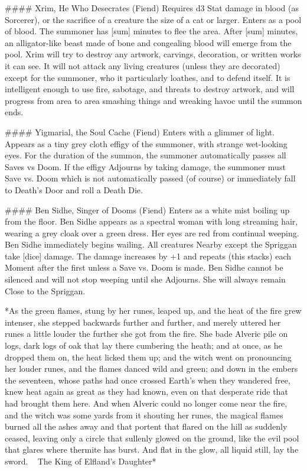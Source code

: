 ####  Xrim, He Who Desecrates (Fiend)
Requires d3 Stat damage in blood (as Sorcerer), or the sacrifice of a creature the size of a cat or larger.  Enters as a pool of blood. The summoner has [sum] minutes to flee the area. After [sum] minutes, an alligator-like beast made of bone and congealing blood will emerge from the pool. Xrim will try to destroy any artwork, carvings, decoration, or written works it can see. It will not attack any living creatures (unless they are decorated) except for the summoner, who it particularly loathes, and to defend itself. It is intelligent enough to use fire, sabotage, and threats to destroy artwork, and will progress from area to area smashing things and wreaking havoc until the summon ends.



####  Yigmarial, the Soul Cache (Fiend)
Enters with a glimmer of light. Appears as a tiny grey cloth effigy of the summoner, with strange wet-looking eyes. For the duration of the summon, the summoner automatically passes all Saves vs Doom. If the effigy Adjourns by taking damage, the summoner must Save vs. Doom which is not automatically passed (of course) or immediately fall to Death's Door and roll a Death Die.


#### Ben Sidhe, Singer of Dooms (Fiend)
Enters as a white mist boiling up from the floor.  Ben Sidhe appears as a spectral woman with long streaming hair, wearing a grey cloak over a green dress.  Her eyes are red from continual weeping.  Ben Sidhe immediately begins wailing.  All creatures Nearby except the Spriggan take [dice] damage.  The damage increases by +1 and repeats (this stacks) each Moment after the first unless a Save vs. Doom is made.  Ben Sidhe cannot be silenced and will not stop weeping until she Adjourns.  She will always remain Close to the Spriggan.










*As the green flames, stung by her runes, leaped up, and the heat of the fire grew intenser, she stepped backwards further and further, and merely uttered her runes a little louder the further she got from the fire. She bade Alveric pile on logs, dark logs of oak that lay there cumbering the heath; and at once, as he dropped them on, the heat licked them up; and the witch went on pronouncing her louder runes, and the flames danced wild and green; and down in the embers the seventeen, whose paths had once crossed Earth's when they wandered free, knew heat again as great as they had known, even on that desperate ride that had brought them here. And when Alveric could no longer come near the fire, and the witch was some yards from it shouting her runes, the magical flames burned all the ashes away and that portent that flared on the hill as suddenly ceased, leaving only a circle that sullenly glowed on the ground, like the evil pool that glares where thermite has burst. And flat in the glow, all liquid still, lay the sword. ~ The King of Elfland's Daughter*



